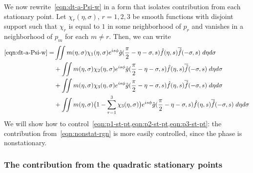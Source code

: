 \documentclass[letterpaper, reqno,final]{amsart}
\newcommand{\fhPi}{\frac{\pi}{2}}
\begin{document}
We now rewrite~\eqref{eqn:dt-a-Psi-w} in a form that isolates contribution from each stationary point.  Let $\chi_r(\eta,\sigma)$, $r=1,2,3$ be smooth functions with disjoint support such that $\chi_r$ is equal to $1$ in some neighborhood of $p_r$ and vanishes in a neighborhood of $p_m$ for each $m \neq r$.  Then, we can write 
\begin{subequations}\begin{align}
    \eqref{eqn:dt-a-Psi-w} =& \iint m(\eta,\sigma) \chi_1(\eta,\sigma) e^{is\phi} \hat{g}(\fhPi-\eta-\sigma,s) \hat{f}(\eta,s) \overline{\hat{f}}(-\sigma,s) \;d\eta d\sigma\label{eqn:p1-st-pt}\\
    &+ \iint m(\eta,\sigma) \chi_2(\eta,\sigma) e^{is\phi} \hat{g}(\fhPi-\eta-\sigma,s) \hat{f}(\eta,s) \overline{\hat{f}}(-\sigma,s) \;d\eta d\sigma\label{eqn:p2-st-pt}\\
    &+ \iint m(\eta,\sigma) \chi_3(\eta,\sigma) e^{is\phi} \hat{g}(\fhPi-\eta-\sigma,s) \hat{f}(\eta,s) \overline{\hat{f}}(-\sigma,s) \;d\eta d\sigma\label{eqn:p3-st-pt}\\
    &+ \iint m(\eta,\sigma) \bigl(1-\sum_{r=1}^3\chi_3(\eta,\sigma)\bigr) e^{is\phi} \hat{g}(\fhPi-\eta-\sigma,s) \hat{f}(\eta,s) \overline{\hat{f}}(-\sigma,s) \;d\eta d\sigma\label{eqn:nonstat-rgn}
\end{align}\end{subequations}
We will show how to control~\cref{eqn:p1-st-pt,eqn:p2-st-pt,eqn:p3-st-pt}: the contribution from~\eqref{eqn:nonstat-rgn} is more easily controlled, since the phase is nonstationary.

\subsubsection{The contribution from the quadratic stationary points}
\end{document}
